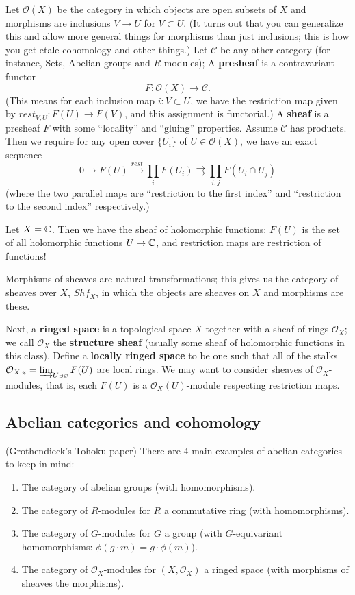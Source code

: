 Let $\mathcal{O}(X)$ be the category in which objects are open subsets of $X$ and morphisms are inclusions $V\to U$ for $V\subset U$. (It turns out that you can generalize this and allow more general things for morphisms than just inclusions; this is how you get etale cohomology and other things.) Let $\mathcal{C}$ be any other category (for instance, Sets, Abelian groups and $R$-modules); A \textbf{presheaf} is a contravariant functor 
$$F:\mathcal{O}(X)\to \mathcal{C}.$$
(This means for each inclusion map $i:V\subset U$, we have the restriction map given by $rest_{V,U}: F(U)\to F(V)$, and this assignment is functorial.) A \textbf{sheaf} is a presheaf $F$ with some ``locality'' and ``gluing'' properties. Assume $\mathcal{C}$ has products. Then we require for any open cover $\{U_i\}$ of $U\in \mathcal{O}(X)$, we have an exact sequence
$$0\to F(U) \overset{rest}{\to} \prod_i F(U_i)\rightrightarrows \prod_{i,j} F(U_i\cap U_j)$$
(where the two parallel maps are ``restriction to the first index'' and ``restriction to the second index'' respectively.)

\begin{example}
Let $X={\mathbb C}$. Then we have the sheaf of holomorphic functions: $F(U)$ is the set of all holomorphic functions $U\to {\mathbb C}$, and restriction maps are restriction of functions!
\end{example}

Morphisms of sheaves are natural transformations; this gives us the category of sheaves over $X$, $Shf_X$, in which the objects are sheaves on $X$ and morphisms are these.

Next, a \textbf{ringed space} is a topological space $X$ together with a sheaf of rings $\mathcal{O}_X$; we call $\mathcal{O}_X$ the \textbf{structure sheaf} (usually some sheaf of holomorphic functions in this class). 
Define a \textbf{locally ringed space} to be one such that all of the stalks $\mathcal{O}_{X,x}=\varinjlim_{U\ni x} F(U)$ are local rings. We may want to consider sheaves of $\mathcal{O}_X$-modules, that is, each $F(U)$ is a $\mathcal{O}_X(U)$-module respecting restriction maps. 

\subsection{Abelian categories and cohomology}
(Grothendieck's Tohoku paper) There are $4$ main examples of abelian categories to keep in mind:

\begin{enumerate}
\item The category of abelian groups (with homomorphisms).
\item The category of $R$-modules for $R$ a commutative ring (with homomorphisms).
\item The category of $G$-modules for $G$ a group (with $G$-equivariant homomorphisms: $\phi(g\cdot m)=g\cdot \phi(m)$).
\item The category of $\mathcal{O}_X$-modules for $(X,\mathcal{O}_X)$ a ringed space (with morphisms of sheaves the morphisms). 
\end{enumerate}

